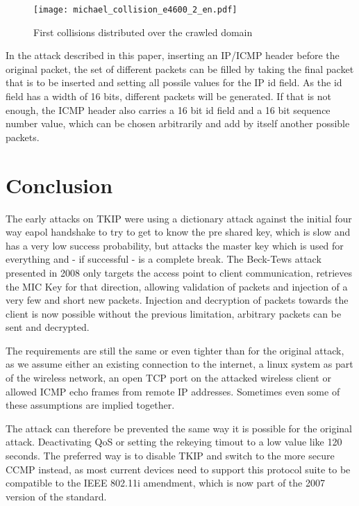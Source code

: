 \documentclass[a4paper,10pt]{scrartcl}
\begin{document}
\begin{figure}[htbp]
  \centering
    \texttt{[image: michael\_collision\_e4600\_2\_en.pdf]}
  \caption{First collisions distributed over the crawled domain}
  \label{figure:michael_collision_e4600_2}
\end{figure}

In the attack described in this paper, inserting an IP/ICMP header before the original packet, the set of different packets can be filled
by taking the final packet that is to be inserted and setting all possile values for the IP id field. As the id field has a width of 16
bits,  different packets will be generated. If that is not enough, the ICMP header also carries a 16 bit id field and a 16 bit sequence
number value, which can be chosen arbitrarily and add by itself another  possible packets.

\section{Conclusion}
\label{sec:conclusion}

The early attacks on TKIP were using a dictionary attack against the initial four way eapol handshake to try to get to know the pre
shared key, which is slow and has a very low success probability, but attacks the master key which is used for everything and
 - if successful - is a complete break. The Beck-Tews attack \citep{BT08} presented in 2008 only targets the access point to client
communication, retrieves the MIC Key for that direction, allowing validation of packets and injection of a very few and short new
packets. Injection and decryption of packets towards the client is now possible without the previous limitation, arbitrary packets
can be sent and decrypted.

The requirements are still the same or even tighter than for the original attack, as we assume either an existing connection to the
internet, a linux system as part of the wireless network, an open TCP port on the attacked wireless client or allowed ICMP echo frames
from remote IP addresses. Sometimes even some of these assumptions are implied together.

The attack can therefore be prevented the same way it is possible for the original attack. Deactivating QoS or setting the rekeying
timout to a low value like 120 seconds. The preferred way is to disable TKIP and switch to the more secure CCMP instead, as most current
devices need to support this protocol suite to be compatible to the IEEE 802.11i amendment, which is now part of the 2007 version of the
standard.



\end{document}
